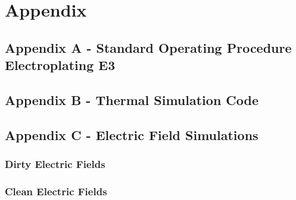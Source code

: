 \chapter*{Appendix}
\section{Appendix A - Standard Operating Procedure Electroplating E3}
\label{sec:SOP}


\newpage
\section{Appendix B - Thermal Simulation Code}
\label{sec:ThermalSimulationCode}


\newpage
\section{Appendix C - Electric Field Simulations}
\label{sec:Efield}

\subsection{Dirty Electric Fields}
\label{sec:dirtyefield}


\newpage
\subsection{Clean Electric Fields}
\label{sec:cleanefield}


% 
